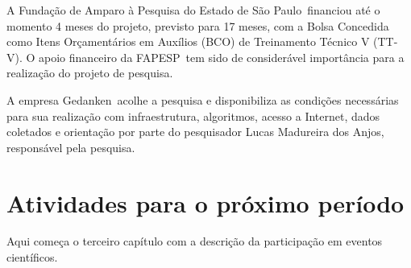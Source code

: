 \documentclass[12pt]{report}
\newcommand{\responsavel}{Lucas Madureira dos Anjos}
\newcommand{\instituicaoSigla}{Gedanken}
\newcommand{\fomento}{Fundação de Amparo à Pesquisa do Estado de São Paulo}
\newcommand{\fomentoSigla}{FAPESP}
\begin{document}
A \fomento\ financiou até o momento 4 meses do projeto, previsto para 17 meses, com a Bolsa Concedida como Itens Orçamentários em Auxílios (BCO) de Treinamento Técnico V (TT-V). O apoio financeiro da \fomentoSigla\ tem sido de considerável importância para a realização do projeto de pesquisa.

A empresa \instituicaoSigla\ acolhe a pesquisa e disponibiliza as condições necessárias para
sua realização com infraestrutura, algoritmos, acesso a Internet, dados coletados e orientação por parte do pesquisador \responsavel , responsável pela pesquisa.

\chapter{Atividades para o próximo período}
\label{chp:atividades}
Aqui começa o terceiro capítulo com a descrição \cite{postgresql} \cite{python} \cite{drf} da participação em eventos científicos.



\end{document}
